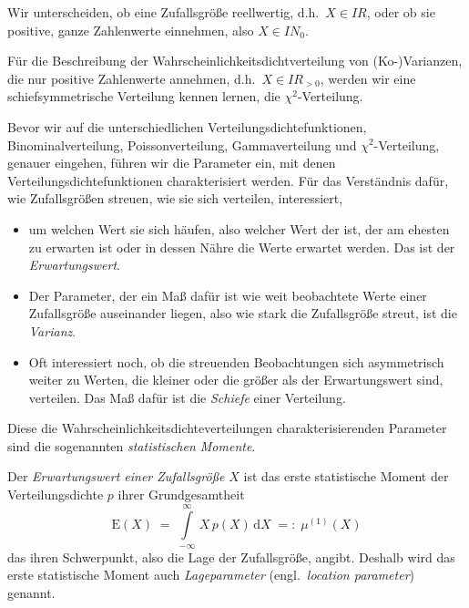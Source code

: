 Wir unterscheiden, ob eine Zufallsgröße reellwertig, d.h.\ $X \in I \!\! R$,
oder ob sie positive, ganze Zahlenwerte einnehmen, also $X \in I \!\! N_0$.

Für die Beschreibung der Wahrscheinlichkeitsdichtverteilung von (Ko-)Varianzen, die nur positive
Zahlenwerte annehmen, d.h.\ $X \in I \!\! R_{> 0}$,
werden wir eine schiefsymmetrische Verteilung kennen lernen, die $\chi^2$-Verteilung.

Bevor wir auf die unterschiedlichen Verteilungsdichtefunktionen, Binominalverteilung,
Poissonverteilung, Gammaverteilung und $\chi^2$-Verteilung,
genauer eingehen, führen wir die Parameter ein, mit denen
Verteilungsdichtefunktionen charakterisiert werden.
Für das Verständnis dafür, wie Zufallsgrößen streuen, wie sie sich verteilen, interessiert,
\begin{itemize}
\item um welchen
Wert sie sich häufen, also welcher Wert der ist, der am ehesten zu erwarten ist oder in dessen Nähre die Werte
erwartet werden. Das ist der \textsl{Erwartungswert}.
\item Der Parameter, der ein Maß dafür ist wie weit beobachtete Werte einer Zufallsgröße auseinander liegen, also wie stark die Zufallsgröße streut, ist die \textsl{Varianz}.
\item Oft interessiert noch, ob die streuenden Beobachtungen sich asymmetrisch weiter zu Werten, die kleiner
oder die größer als der Erwartungswert sind, verteilen. Das Maß dafür ist die \textsl{Schiefe} einer Verteilung.
\end{itemize}

Diese die Wahrscheinlichkeitsdichteverteilungen charakterisierenden Parameter sind die
sogenannten \textsl{statistischen Momente}.

Der \textsl{Erwartungswert einer Zufallsgröße} $X$ ist das erste statistische Moment
der Verteilungsdichte $p$ ihrer Grundgesamtheit
\begin{equation}
\mathrm{E}(X) \; = \; \int\limits_{-\infty}^{\infty} \, X \, p(X) \, \mathrm{d} X \; =: \; \mu^{(1)}(X)
\end{equation}
das ihren Schwerpunkt, also die Lage der Zufallsgröße, angibt. Deshalb wird das erste
statistische Moment auch \textsl{Lageparameter} (engl.\ \textsl{location parameter}) genannt.

